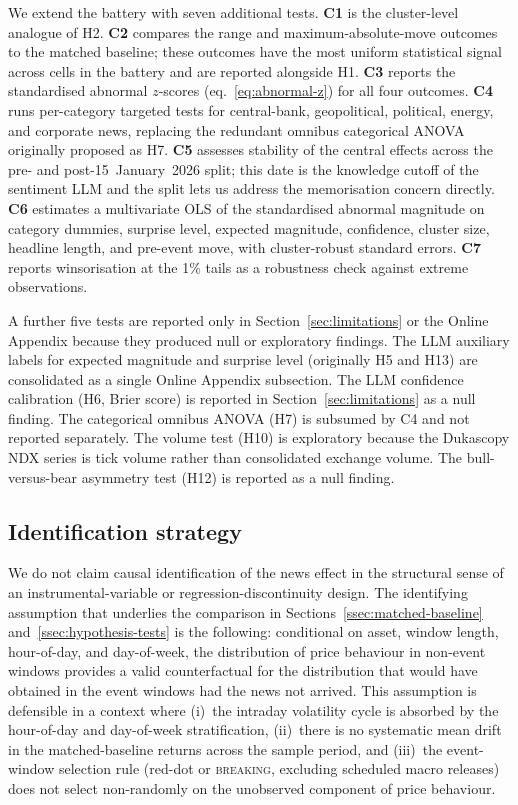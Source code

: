 We extend the battery with seven additional tests. \textbf{C1} is
the cluster-level analogue of H2. \textbf{C2} compares the range and
maximum-absolute-move outcomes to the matched baseline; these
outcomes have the most uniform statistical signal across cells in
the battery and are reported alongside H1. \textbf{C3} reports the
standardised abnormal $z$-scores (eq.~\ref{eq:abnormal-z}) for all
four outcomes. \textbf{C4} runs per-category targeted tests for
central-bank, geopolitical, political, energy, and corporate news,
replacing the redundant omnibus categorical ANOVA originally
proposed as H7. \textbf{C5} assesses stability of the central
effects across the pre- and post-15~January~2026 split; this date
is the knowledge cutoff of the sentiment LLM and the split lets us
address the memorisation concern directly. \textbf{C6} estimates a
multivariate OLS of the standardised abnormal magnitude on category
dummies, surprise level, expected magnitude, confidence, cluster
size, headline length, and pre-event move, with cluster-robust
standard errors. \textbf{C7} reports winsorisation at the 1\% tails
as a robustness check against extreme observations.

A further five tests are reported only in Section~\ref{sec:limitations}
or the Online Appendix because they produced null or exploratory
findings. The LLM auxiliary labels for expected magnitude and
surprise level (originally H5 and H13) are consolidated as a single
Online Appendix subsection. The LLM confidence calibration
(H6, Brier score) is reported in Section~\ref{sec:limitations} as a
null finding. The categorical omnibus ANOVA (H7) is subsumed by C4
and not reported separately. The volume test (H10) is exploratory
because the Dukascopy NDX series is tick volume rather than
consolidated exchange volume. The bull-versus-bear asymmetry test
(H12) is reported as a null finding.

\subsection{Identification strategy}
\label{ssec:identification}

We do not claim causal identification of the news effect in the
structural sense of an instrumental-variable or
regression-discontinuity design. The identifying assumption that
underlies the comparison in Sections~\ref{ssec:matched-baseline}
and~\ref{ssec:hypothesis-tests} is the following: conditional on
asset, window length, hour-of-day, and day-of-week, the
distribution of price behaviour in non-event windows provides a
valid counterfactual for the distribution that would have obtained
in the event windows had the news not arrived. This assumption is
defensible in a context where (i)~the intraday volatility cycle is
absorbed by the hour-of-day and day-of-week stratification,
(ii)~there is no systematic mean drift in the matched-baseline
returns across the sample period, and (iii)~the event-window
selection rule (red-dot or \textsc{breaking}, excluding scheduled
macro releases) does not select non-randomly on the unobserved
component of price behaviour.

